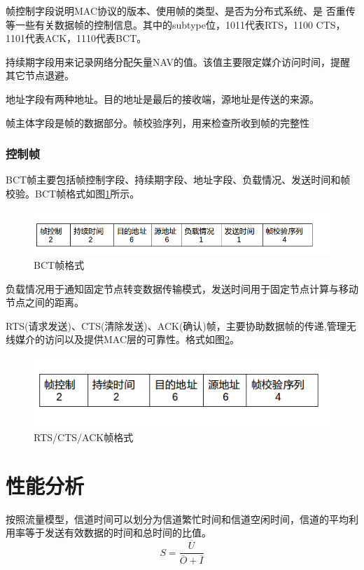 帧控制字段说明MAC协议的版本、使用帧的类型、是否为分布式系统、是
否重传等一些有关数据帧的控制信息。其中的subtype位，1011代表RTS，1100 CTS，1101代表ACK，1110代表BCT。

持续期字段用来记录网络分配矢量NAV的值。该值主要限定媒介访问时间，提醒其它节点退避。

地址字段有两种地址。目的地址是最后的接收端，源地址是传送的来源。

帧主体字段是帧的数据部分。帧校验序列，用来检查所收到帧的完整性

\subsubsection{控制帧}
BCT帧主要包括帧控制字段、持续期字段、地址字段、负载情况、发送时间和帧校验。BCT帧格式如图\ref{fig8}所示。
\begin{figure}[!ht]
	\centering
	\includegraphics[scale=0.5]{figures/bct.png}
	\caption{
		BCT帧格式
	}
	\label{fig8}
\end{figure}

负载情况用于通知固定节点转变数据传输模式，发送时间用于固定节点计算与移动节点之间的距离。

RTS(请求发送)、CTS(清除发送)、ACK(确认)帧，主要协助数据帧的传递,管理无线媒介的访问以及提供MAC层的可靠性。格式如图\ref{fig11}。
\begin{figure}[!ht]
	\centering
	\includegraphics[scale=0.5]{figures/ctrl.png}
	\caption{
		RTS/CTS/ACK帧格式
	}
	\label{fig11}
\end{figure}


\section {性能分析}
按照流量模型\cite{kleinrock1975packet}，信道时间可以划分为信道繁忙时间和信道空闲时间，信道的平均利用率等于发送有效数据的时间和总时间的比值。
\begin{equation}
S=\frac{\overline U}{\overline O+\overline I}
\end{equation}

